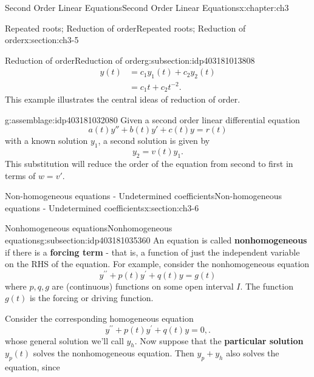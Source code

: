 \documentclass[oneside,10pt,]{book}
\newcommand{\terminology}[1]{\textbf{#1}}
\numberwithin{equation}{section}
\numberwithin{equation}{section}
\newcommand{\amp}{&}
\begin{document}
\begin{chapterptx}{Second Order Linear Equations}{}{Second Order Linear Equations}{}{}{x:chapter:ch3}
\begin{sectionptx}{Repeated roots; Reduction of order}{}{Repeated roots; Reduction of order}{}{}{x:section:ch3-5}
\begin{subsectionptx}{Reduction of order}{}{Reduction of order}{}{}{g:subsection:idp403181013808}
\begin{align*}
y(t) \amp =c_{1}y_{1}(t)+c_{2}y_{2}(t)\\
\amp =c_{1}t+c_{2}t^{-2}.
\end{align*}
%
 This example illustrates the central ideas of reduction of order. \begin{assemblage}{}{g:assemblage:idp403181032080}%
Given a second order linear differential equation%
\begin{equation*}
a(t) y'' + b(t) y' + c(t) y = r(t)
\end{equation*}
with a known solution \(y_1\), a second solution is given by%
\begin{equation*}
y_2 = v(t)y_1.
\end{equation*}
This substitution will reduce the order of the equation from second to first in terms of \(w = v'\).%
\end{assemblage}
\end{subsectionptx}
\end{sectionptx}
%
%
\typeout{************************************************}
\typeout{************************************************}
%
\begin{sectionptx}{Non-homogeneous equations - Undetermined coefficients}{}{Non-homogeneous equations - Undetermined coefficients}{}{}{x:section:ch3-6}
%
%
\typeout{************************************************}
\typeout{************************************************}
%
\begin{subsectionptx}{Nonhomogeneous equations}{}{Nonhomogeneous equations}{}{}{g:subsection:idp403181035360}
An equation is called \terminology{nonhomogeneous} if there is a \terminology{forcing term} - that is, a function of just the independent variable on the RHS of the equation. For example, consider the nonhomogeneous equation%
\begin{equation*}
y^{\prime\prime}+p(t)y^{\prime}+q(t)y=g(t)
\end{equation*}
where \(p,q,g\) are (continuous) functions on some open interval \(I\). The function \(g(t)\) is the forcing or driving function.%
\par
Consider the corresponding homogeneous equation%
\begin{equation*}
y^{\prime\prime}+p(t)y^{\prime}+q(t)y=0,.
\end{equation*}
whose general solution we'll call \(y_{h}\). Now suppose that the \terminology{particular solution} \(y_p(t)\) solves the nonhomogeneous equation. Then \(y_p + y_h\) also solves the equation, since%

\end{subsectionptx}
\end{sectionptx}
\end{chapterptx}
\end{document}
